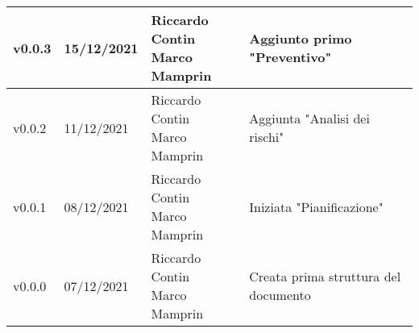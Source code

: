 \begin{center}
\begin{longtable}{|p{2cm}|p{2.1cm}|p{4.2cm}|p{4.8cm}|}
    v0.0.3            & 15/12/2021    & \aCapo{Riccardo Contin\\Marco Mamprin}                & Aggiunto primo "Preventivo" \\ \hline
    v0.0.2            & 11/12/2021    & \aCapo{Riccardo Contin\\Marco Mamprin}                & Aggiunta "Analisi dei rischi" \\ \hline
    v0.0.1            & 08/12/2021    & \aCapo{Riccardo Contin\\Marco Mamprin}                & Iniziata "Pianificazione" \\ \hline
    v0.0.0            & 07/12/2021    & \aCapo{Riccardo Contin\\Marco Mamprin}                & Creata prima struttura del documento \\ \hline
  \end{longtable}
\end{center}
